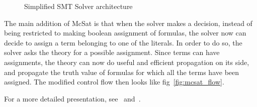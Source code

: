 \begin{figure}
  \begin{center}
  \end{center}
  \caption{Simplified SMT Solver architecture}\label{fig:smt_flow}
\end{figure}

The main addition of McSat is that when the solver makes a decision, instead of
being restricted to making boolean assignment of formulas, the solver now can
decide to assign a term belonging to one of the literals. In order to do so,
the solver asks the theory for a possible assignment. Since terms can have
assignments, the theory can now do useful and efficient propagation on its
side, and propagate the truth value of formulas for which all the terms
have been assigned. The modified control flow then looks like
fig~\ref{fig:mcsat_flow}.

For a more detailed presentation, see~\cite{FMCAD13} and~\cite{VMCAI13}.

